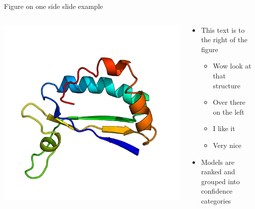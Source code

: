 \documentclass{beamer}
\begin{document}
\begin{frame}{Figure on one side slide example}
  \begin{columns}
    \begin{column}{0.5\textwidth}
      \centering
      \includegraphics[width=1\textwidth]{2OKQA.png}
    \end{column}
    \begin{column}{0.5\textwidth}
      \begin{itemize}
      \setlength{\itemsep}{1em}
        \item This text is to the right of the figure 
        \begin{itemize}
          \item Wow look at that structure  
          \item Over there on the left
          \item I like it 
          \item Very nice 
        \end{itemize}
        \item Models are ranked and grouped into confidence categories
      \end{itemize}
    \end{column}
  \end{columns}
\end{frame}
\end{document}
